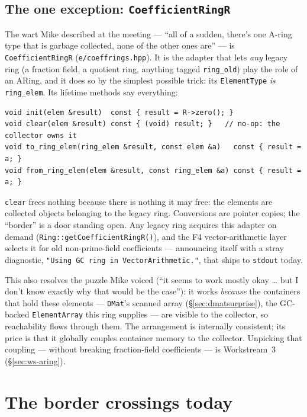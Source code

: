 \documentclass[11pt,oneside]{report}
\newcommand{\code}[1]{\textcolor{m2code}{\texttt{#1}}}
\newcommand{\file}[1]{\textcolor{m2file}{\texttt{#1}}}
\begin{document}
\subsection{The one exception: \code{CoefficientRingR}}
\label{sec:wart}

The wart Mike described at the meeting --- ``all of a sudden, there's one
A-ring type that is garbage collected, none of the other ones are'' --- is
\code{CoefficientRingR} (\file{e/coeffrings.hpp}). It is the adapter that
lets \emph{any} legacy ring (a fraction field, a quotient ring, anything
tagged \code{ring\_old}) play the role of an ARing, and it does so by the
simplest possible trick: its \code{ElementType} \emph{is} \code{ring\_elem}.
Its lifetime methods say everything:

\begin{lstlisting}
void init(elem &result)  const { result = R->zero(); }
void clear(elem &result) const { (void) result; }   // no-op: the collector owns it
void to_ring_elem(ring_elem &result, const elem &a)   const { result = a; }
void from_ring_elem(elem &result, const ring_elem &a) const { result = a; }
\end{lstlisting}

\noindent \code{clear} frees nothing because there is nothing it may free:
the elements are collected objects belonging to the legacy ring.
Conversions are pointer copies; the ``border'' is a door standing open.
Any legacy ring acquires this adapter on demand
(\code{Ring::getCoefficientRingR()}), and the F4 vector-arithmetic layer
selects it for old non-prime-field coefficients --- announcing itself with
a stray diagnostic, \code{"Using GC ring in VectorArithmetic."}, that ships
to \code{stdout} today.

This also resolves the puzzle Mike voiced (``it seems to work mostly okay
\ldots{} but I don't know exactly why that would be the case''): it works
\emph{because} the containers that hold these elements --- \code{DMat}'s
scanned array (\S\ref{sec:dmatsurprise}), the GC-backed
\code{ElementArray} this ring supplies --- are visible to the collector, so
reachability flows through them. The arrangement is internally consistent;
its price is that it globally couples container memory to the collector.
Unpicking that coupling --- without breaking fraction-field coefficients
--- is Workstream~3 (\S\ref{sec:ws-aring}).

\section{The border crossings today}
\label{sec:border}
\end{document}
